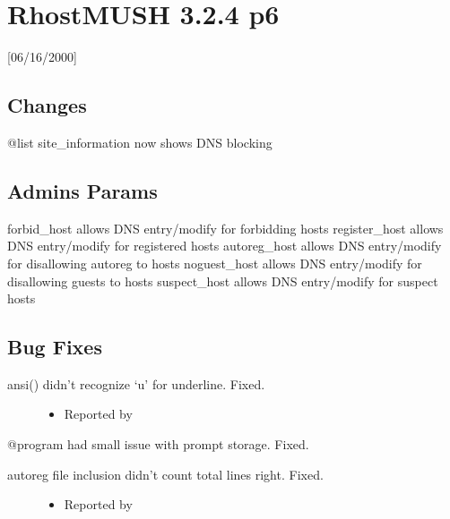\documentclass[letterpaper,10pt,english]{sphinxmanual}
\begin{document}
\section{RhostMUSH 3.2.4 p6}
\label{\detokenize{changelog:rhostmush-3-2-4-p6}}\label{\detokenize{changelog:changelog-3-2-4p6}}
\sphinxAtStartPar
{[}06/16/2000{]}


\subsection{Changes}
\label{\detokenize{changelog:id70}}
\sphinxAtStartPar
@list site\_information now shows DNS blocking


\subsection{Admins Params}
\label{\detokenize{changelog:admins-params}}
\sphinxAtStartPar
forbid\_host \sphinxhyphen{} allows DNS entry/modify for forbidding hosts
register\_host \sphinxhyphen{} allows DNS entry/modify for registered hosts
autoreg\_host \sphinxhyphen{} allows DNS entry/modify for disallowing autoreg to hosts
noguest\_host \sphinxhyphen{} allows DNS entry/modify for disallowing guests to hosts
suspect\_host \sphinxhyphen{} allows DNS entry/modify for suspect hosts


\subsection{Bug Fixes}
\label{\detokenize{changelog:id71}}\begin{description}
\item[{ansi() didn’t recognize ‘u’ for underline.  Fixed.}] \leavevmode\begin{itemize}
\item {} 
\sphinxAtStartPar
Reported by 

\end{itemize}

\end{description}

\sphinxAtStartPar
@program had small issue with prompt storage.  Fixed.
\begin{description}
\item[{autoreg file inclusion didn’t count total lines right.  Fixed.}] \leavevmode\begin{itemize}
\item {} 
\sphinxAtStartPar
Reported by 

\end{itemize}

\end{description}
\end{document}
